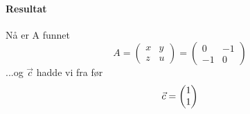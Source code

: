 \paragraph{Resultat}
Nå er A funnet
$$
A =
\left( \begin{matrix}
  x & y \\
  z & u
\end{matrix} \right) =
\left( \begin{matrix}
  0 & -1 \\
  -1 & 0 
\end{matrix} \right)
$$
...og $\vec{c}$ hadde vi fra før
$$\vec{c} = \colvec{1}{1}$$
